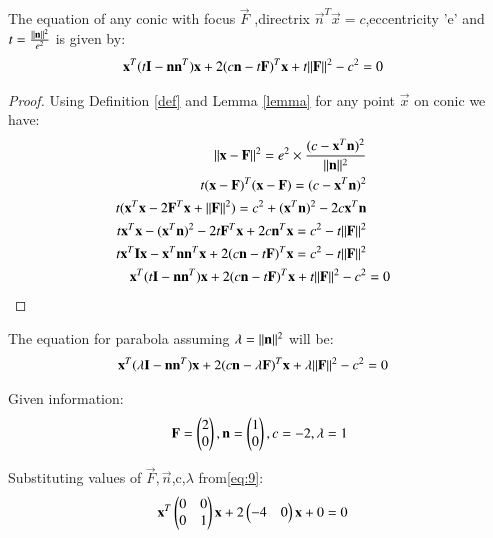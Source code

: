 \documentclass[journal,12pt,twocolumn]{IEEEtran}
\begin{document}
\begin{theorem}
The equation of any conic with focus $\vec{F}$ ,directrix $\vec{n}^T\vec{x}=c$,eccentricity 'e' and $t=\frac{\Vert\mathbf{n}\rVert^2}{e^2}$ is given by:
\begin{align}
\mathbf{x}^T(t\mathbf{I}-\mathbf{n}\mathbf{n}^T)\mathbf{x}+2(c\mathbf{n}-t\mathbf{F})^T\mathbf{x}+t\Vert\mathbf{F}\rVert^2-c^2&=0
\end{align}
\end{theorem}

\begin{proof}

Using Definition \ref{def} and Lemma \ref{lemma} for any point $\vec{x}$ on conic we have:
\begin{align}
\Vert\mathbf{x}-\mathbf{F}\rVert^2=e^2\times\frac{({c-\mathbf{x}^T\mathbf{n}})^2}{\Vert\mathbf{n}\rVert^2}\label{eq:1} \\
t(\mathbf{x}-\mathbf{F})^T(\mathbf{x}-\mathbf{F})=(c-\mathbf{x}^T\mathbf{n})^2
\\
t(\mathbf{x}^T\mathbf{x}-2\mathbf{F}^T\mathbf{x}+\Vert\mathbf{F}\rVert^2)=c^2+(\mathbf{x}^T\mathbf{n})^2-2c\mathbf{x}^T\mathbf{n}\\
t\mathbf{x}^T\mathbf{x}-(\mathbf{x}^T\mathbf{n})^2-2t\mathbf{F}^T\mathbf{x}+2c\mathbf{n}^T\mathbf{x}=c^2-t\Vert\mathbf{F}\rVert^2\\
t\mathbf{x}^T\mathbf{I}\mathbf{x}-\mathbf{x}^T\mathbf{n}\mathbf{n}^T\mathbf{x}+2(c\mathbf{n}-t\mathbf{F})^T\mathbf{x}=c^2-t\Vert\mathbf{F}\rVert^2\\
\mathbf{x}^T(t\mathbf{I}-\mathbf{n}\mathbf{n}^T)\mathbf{x}+2(c\mathbf{n}-t\mathbf{F})^T\mathbf{x}+t\Vert\mathbf{F}\rVert^2-c^2&=0
\end{align}
\end{proof}
\begin{corollary}
The equation for parabola assuming $\lambda=\Vert\mathbf{n}\rVert^2$ will be: 
\begin{align}
\mathbf{x}^T(\lambda\mathbf{I}-\mathbf{n}\mathbf{n}^T)\mathbf{x}+2(c\mathbf{n}-\lambda\mathbf{F})^T\mathbf{x}+\lambda\Vert\mathbf{F}\rVert^2-c^2&=0\label{eq:8}
\end{align}
\end{corollary}
Given information:
\begin{align}
\mathbf{F}=\begin{pmatrix}2\\0\end{pmatrix},
\mathbf{n}=\begin{pmatrix}1\\0\end{pmatrix},
c=-2\label{eq:9},
\lambda=1
\end{align}


Substituting values of $\vec{F},\vec{n}$,c,$\lambda$ from\eqref{eq:9}:
\begin{align}
\mathbf{x}^T\begin{pmatrix}0&0\\0&1\end{pmatrix}\mathbf{x}+2\begin{pmatrix}-4&0\end{pmatrix}\mathbf{x}+0&=0\label{eq:11}
\end{align}
\end{document}
